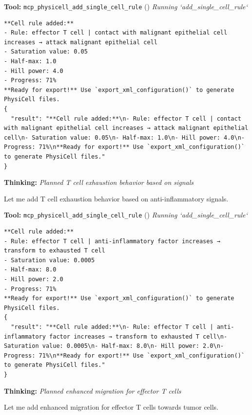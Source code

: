 \documentclass[11pt,a4paper]{article}
\begin{document}
\begin{toolokbox}
\textbf{Tool:} \texttt{mcp\_physicell\_add\_single\_cell\_rule} (\checkmark)
\textit{Running `add\_single\_cell\_rule`}
\begin{lstlisting}
**Cell rule added:**
- Rule: effector T cell | contact with malignant epithelial cell increases → attack malignant epithelial cell
- Saturation value: 0.05
- Half-max: 1.0
- Hill power: 4.0
- Progress: 71%
**Ready for export!** Use `export_xml_configuration()` to generate PhysiCell files.
{
  "result": "**Cell rule added:**\n- Rule: effector T cell | contact with malignant epithelial cell increases → attack malignant epithelial cell\n- Saturation value: 0.05\n- Half-max: 1.0\n- Hill power: 4.0\n- Progress: 71%\n**Ready for export!** Use `export_xml_configuration()` to generate PhysiCell files."
}
\end{lstlisting}
\end{toolokbox}
\begin{thinkbox}
\textbf{Thinking:} \textit{Planned T cell exhaustion behavior based on signals}

Let me add T cell exhaustion behavior based on anti-inflammatory signals.

\end{thinkbox}
\begin{toolokbox}
\textbf{Tool:} \texttt{mcp\_physicell\_add\_single\_cell\_rule} (\checkmark)
\textit{Running `add\_single\_cell\_rule`}
\begin{lstlisting}
**Cell rule added:**
- Rule: effector T cell | anti-inflammatory factor increases → transform to exhausted T cell
- Saturation value: 0.0005
- Half-max: 8.0
- Hill power: 2.0
- Progress: 71%
**Ready for export!** Use `export_xml_configuration()` to generate PhysiCell files.
{
  "result": "**Cell rule added:**\n- Rule: effector T cell | anti-inflammatory factor increases → transform to exhausted T cell\n- Saturation value: 0.0005\n- Half-max: 8.0\n- Hill power: 2.0\n- Progress: 71%\n**Ready for export!** Use `export_xml_configuration()` to generate PhysiCell files."
}
\end{lstlisting}
\end{toolokbox}
\begin{thinkbox}
\textbf{Thinking:} \textit{Planned enhanced migration for effector T cells}

Let me add enhanced migration for effector T cells towards tumor cells.

\end{thinkbox}
\end{document}
